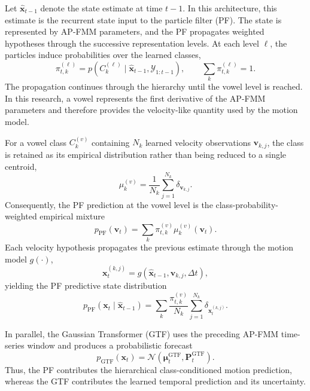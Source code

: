 \documentclass[a4paper]{article}
\begin{document}
      Let \(\hat{\mathbf{x}}_{t-1}\) denote the state estimate at time \(t-1\). In this architecture, this estimate is the recurrent state input to the particle filter (PF). The state is represented by AP-FMM parameters, and the PF propagates weighted hypotheses through the successive representation levels. At each level \(\ell\), the particles induce probabilities over the learned classes,
      \[
      \pi_{t,k}^{(\ell)}
      =
      p\!\left(C_k^{(\ell)}\mid \hat{\mathbf{x}}_{t-1},\mathcal{Y}_{1:t-1}\right),
      \qquad
      \sum_k \pi_{t,k}^{(\ell)}=1.
      \]
      The propagation continues through the hierarchy until the vowel level is reached. In this research, a vowel represents the first derivative of the AP-FMM parameters and therefore provides the velocity-like quantity used by the motion model.

      For a vowel class \(C_k^{(v)}\) containing \(N_k\) learned velocity observations \(\mathbf{v}_{k,j}\), the class is retained as its empirical distribution rather than being reduced to a single centroid,
      \[
      \mu_k^{(v)}
      =
      \frac{1}{N_k}\sum_{j=1}^{N_k}\delta_{\mathbf{v}_{k,j}}.
      \]
      Consequently, the PF prediction at the vowel level is the class-probability-weighted empirical mixture
      \[
      p_{\mathrm{PF}}(\mathbf{v}_t)
      =
      \sum_k \pi_{t,k}^{(v)}\mu_k^{(v)}(\mathbf{v}_t).
      \]
      Each velocity hypothesis propagates the previous estimate through the motion model \(g(\cdot)\),
      \[
      \mathbf{x}_{t}^{(k,j)}
      =
      g\!\left(\hat{\mathbf{x}}_{t-1},\mathbf{v}_{k,j},\Delta t\right),
      \]
      yielding the PF predictive state distribution
      \[
      p_{\mathrm{PF}}(\mathbf{x}_t\mid\hat{\mathbf{x}}_{t-1})
      =
      \sum_k\frac{\pi_{t,k}^{(v)}}{N_k}
      \sum_{j=1}^{N_k}
      \delta_{\mathbf{x}_{t}^{(k,j)}}.
      \]

      In parallel, the Gaussian Transformer (GTF) uses the preceding AP-FMM time-series window and produces a probabilistic forecast
      \[
      p_{\mathrm{GTF}}(\mathbf{x}_t)
      =
      \mathcal{N}\!\left(
      \boldsymbol{\mu}_{t}^{\mathrm{GTF}},
      \mathbf{P}_{t}^{\mathrm{GTF}}
      \right).
      \]
      Thus, the PF contributes the hierarchical class-conditioned motion prediction, whereas the GTF contributes the learned temporal prediction and its uncertainty.
\end{document}
